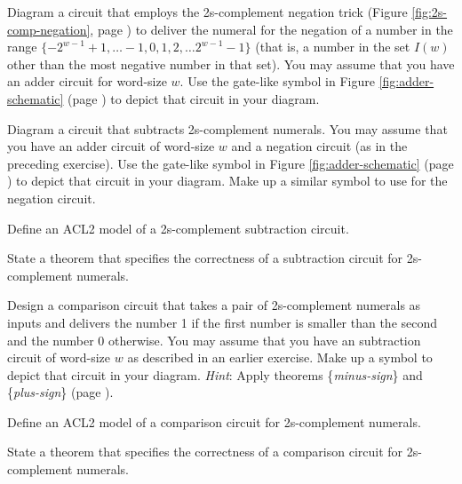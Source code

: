 \begin{ExerciseList}
\Exercise Diagram a circuit that employs
the 2s-complement negation trick (Figure \ref{fig:2s-comp-negation},
page \pageref{fig:2s-comp-negation}) to deliver the
numeral for the negation of a number in the range
$\{-2^{w-1}+1, \dots -1, 0, 1, 2, \dots 2^{w-1}-1\}$
(that is, a number in the set $I(w)$ other than the
most negative number in that set).
You may assume that you have an adder circuit for
word-size $w$. Use the gate-like symbol
in Figure \ref{fig:adder-schematic} (page \pageref{fig:adder-schematic})
to depict that circuit in your diagram.

\Exercise Diagram a circuit that subtracts 2s-complement numerals.
You may assume that you have an adder circuit of word-size $w$
and a negation circuit (as in the preceding exercise).
Use the gate-like symbol
in Figure \ref{fig:adder-schematic} (page \pageref{fig:adder-schematic})
to depict that circuit in your diagram.
Make up a similar symbol to use for the negation circuit.

\Exercise Define an ACL2 model of a 2s-complement subtraction circuit.

\Exercise State a theorem that specifies the correctness of
a subtraction circuit for 2s-complement numerals.

\Exercise Design a comparison circuit that takes a pair of
2s-complement numerals as inputs and delivers the number 1
if the first number is smaller than the second
and the number 0 otherwise.
You may assume that you have an subtraction circuit of word-size $w$
as described in an earlier exercise. Make up a symbol to depict
that circuit in your diagram.
\emph{Hint}: Apply theorems \{\emph{minus-sign}\} and \{\emph{plus-sign}\}
(page \pageref{minus-sign}).

\Exercise Define an ACL2 model of a comparison circuit for 2s-complement numerals.

\Exercise State a theorem that specifies the correctness of
a comparison circuit for 2s-complement numerals.

\end{ExerciseList}

